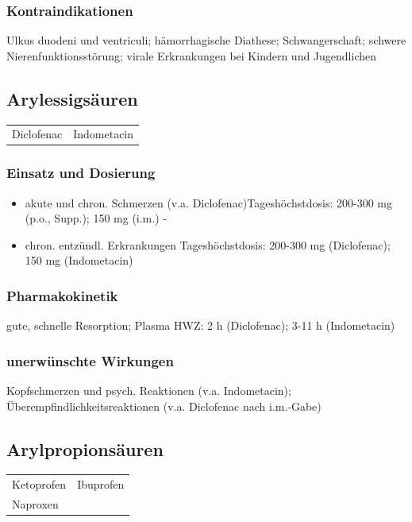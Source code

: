 \documentclass[10pt,a4paper]{report}
\begin{document}
\subsubsection{Kontraindikationen} %
\label{par:kontraindikationen}
Ulkus duodeni und ventriculi; hämorrhagische Diathese; Schwangerschaft; schwere Nierenfunktionsstörung; virale Erkrankungen bei Kindern und Jugendlichen
\subsection{Arylessigsäuren} %
\label{ssub:arylessigs_uren}
\begin{tabularx}{\textwidth}{XX}
Diclofenac&Indometacin\\
\end{tabularx}
\subsubsection{Einsatz und Dosierung} %
\label{par:einsatz_und_dosierung}
\begin{itemize}
	\item akute und chron. Schmerzen (v.a. Diclofenac)Tageshöchstdosis: 200-300 mg (p.o., Supp.); 150 mg (i.m.)
-	\item chron. entzündl. Erkrankungen	Tageshöchstdosis: 200-300 mg (Diclofenac); 150 mg (Indometacin) 
\end{itemize}
\subsubsection{Pharmakokinetik} %
\label{par:pharmakokinetik}
gute, schnelle Resorption; Plasma HWZ: 2 h (Diclofenac); 3-11 h (Indometacin)
\subsubsection{unerwünschte Wirkungen} %
\label{par:unerw_nschte_wirkungen}
Kopfschmerzen und psych. Reaktionen (v.a. Indometacin); Überempfindlichkeitsreaktionen (v.a. Diclofenac nach i.m.-Gabe)
\subsection{Arylpropionsäuren} %
\label{ssub:subsubsection_name}
\begin{tabularx}{\textwidth}{XX}
Ketoprofen&Ibuprofen\\
Naproxen&\\
\end{tabularx}
\end{document}
